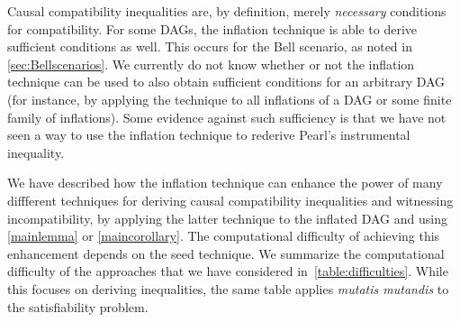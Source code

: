 {Causal compatibility inequalities are, by definition, merely {\em necessary} conditions for compatibility.  For some DAGs, the inflation technique is able to derive sufficient conditions as well.  This occurs for the Bell scenario, as noted in \cref{sec:Bellscenarios}.  We currently do not know whether or not the inflation technique can be used to also obtain sufficient conditions for an arbitrary DAG (for instance, by applying the technique to all inflations of a DAG or some finite family of inflations).
Some evidence against such sufficiency is that we have not seen a way to use the inflation technique to rederive Pearl's instrumental inequality.



We have described how the inflation technique can enhance the power of many diffferent techniques for deriving causal compatibility inequalities and witnessing incompatibility, by applying the latter technique to the inflated DAG and using \cref{mainlemma} or \cref{maincorollary}.  The computational difficulty of achieving this enhancement depends on the seed technique.  We summarize the computational difficulty of the approaches that we have considered in~\cref{table:difficulties}. While this focuses on deriving inequalities, the same table applies \emph{mutatis mutandis} to the satisfiability problem. 

}
